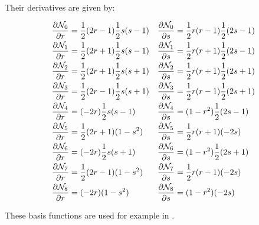 Their derivatives are given by:
\begin{mdframed}[backgroundcolor=blue!5]
\begin{align}
\frac{\partial {\mathcal{N}}_0}{\partial r}&= \frac{1}{2}(2r-1)  \frac{1}{2}s(s-1) & 
\frac{\partial {\mathcal{N}}_0}{\partial s}&= \frac{1}{2}r(r-1)  \frac{1}{2}(2s-1)\nonumber\\
\frac{\partial {\mathcal{N}}_1}{\partial r}&= \frac{1}{2}(2r+1)  \frac{1}{2}s(s-1) &
\frac{\partial {\mathcal{N}}_1}{\partial s}&= \frac{1}{2}r(r+1)  \frac{1}{2}(2s-1)\nonumber\\
\frac{\partial {\mathcal{N}}_2}{\partial r}&= \frac{1}{2}(2r+1)  \frac{1}{2}s(s+1) &
\frac{\partial {\mathcal{N}}_2}{\partial s}&= \frac{1}{2}r(r+1)  \frac{1}{2}(2s+1)\nonumber\\
\frac{\partial {\mathcal{N}}_3}{\partial r}&= \frac{1}{2}(2r-1)  \frac{1}{2}s(s+1) &
\frac{\partial {\mathcal{N}}_3}{\partial s}&= \frac{1}{2}r(r-1)  \frac{1}{2}(2s+1)\nonumber\\
\frac{\partial {\mathcal{N}}_4}{\partial r}&=       (-2r)  \frac{1}{2}s(s-1) &
\frac{\partial {\mathcal{N}}_4}{\partial s}&=     (1-r^2)  \frac{1}{2}(2s-1)\nonumber\\
\frac{\partial {\mathcal{N}}_5}{\partial r}&= \frac{1}{2}(2r+1)     (1-s^2)&
\frac{\partial {\mathcal{N}}_5}{\partial s}&= \frac{1}{2}r(r+1)        (-2s)\nonumber\\
\frac{\partial {\mathcal{N}}_6}{\partial r}&=       (-2r)  \frac{1}{2}s(s+1)&
\frac{\partial {\mathcal{N}}_6}{\partial s}&=     (1-r^2)  \frac{1}{2}(2s+1)\nonumber\\
\frac{\partial {\mathcal{N}}_7}{\partial r}&= \frac{1}{2}(2r-1)     (1-s^2)&
\frac{\partial {\mathcal{N}}_7}{\partial s}&= \frac{1}{2}r(r-1)        (-2s)\nonumber\\
\frac{\partial {\mathcal{N}}_8}{\partial r}&=       (-2r)     (1-s^2)&
\frac{\partial {\mathcal{N}}_8}{\partial s}&=     (1-r^2)        (-2s)\nonumber
\end{align}
\end{mdframed}
These basis functions are used for example in .
